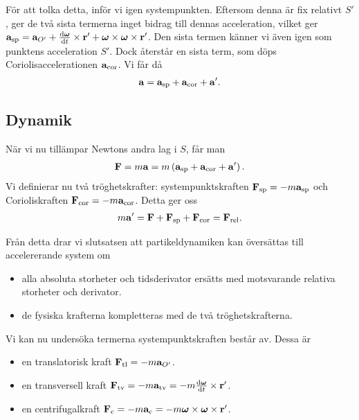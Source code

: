 För att tolka detta, inför vi igen systempunkten. Eftersom denna är fix relativt $S'$, ger de två sista termerna inget bidrag till dennas acceleration, vilket ger $\vb{a}_{\text{sp}} = \vb{a}_{O'} + \dv{\vb*{\omega}}{t}\times\vb{r}' + \vb*{\omega}\times\vb*{\omega}\times\vb{r}'$. Den sista termen känner vi även igen som punktens acceleration $S'$. Dock återstår en sista term, som döps Coriolisaccelerationen $\vb{a}_{\text{cor}}$. Vi får då
\begin{align*}
	\vb{a} = \vb{a}_{\text{sp}} + \vb{a}_{\text{cor}} + \vb{a}'.
\end{align*}

\subsection{Dynamik}

När vi nu tillämpar Newtons andra lag i $S$, får man
\begin{align*}
	\vb{F} = m\vb{a} = m\left(\vb{a}_{\text{sp}} + \vb{a}_{\text{cor}} + \vb{a}'\right).
\end{align*}
Vi definierar nu två tröghetskrafter: systempunktskraften $\vb{F}_{\text{sp}} = - m\vb{a}_{\text{sp}}$ och Corioliskraften $\vb{F}_{\text{cor}} = - m\vb{a}_{\text{cor}}$. Detta ger oss
\begin{align*}
	m\vb{a}' = \vb{F} + \vb{F}_{\text{sp}} + \vb{F}_{\text{cor}} = \vb{F}_{\text{rel}}.
\end{align*}

Från detta drar vi slutsatsen att partikeldynamiken kan översättas till accelererande system om
\begin{itemize}
	\item alla absoluta storheter och tidsderivator ersätts med motsvarande relativa storheter och derivator.
	\item de fysiska krafterna kompletteras med de två tröghetskrafterna.
\end{itemize}

Vi kan nu undersöka termerna systempunktskraften består av. Dessa är
\begin{itemize}
	\item en translatorisk kraft $\vb{F}_{\text{tl}} = -m\vb{a}_{O'}$.
	\item en transversell kraft $\vb{F}_{\text{tv}} = -m\vb{a}_{\text{tv}} = -m\dv{\vb*{\omega}}{t}\times\vb{r}'$.
	\item en centrifugalkraft $\vb{F}_{\text{c}} = -m\vb{a}_{\text{c}} = -m\vb*{\omega}\times\vb*{\omega}\times\vb{r}'$.
\end{itemize}